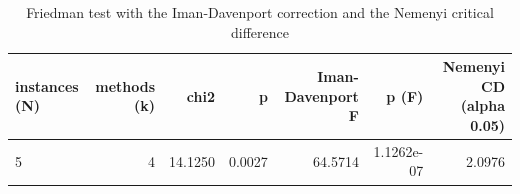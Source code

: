 \begin{table}[htbp]
\centering
\small
\caption{Friedman test with the Iman-Davenport correction and the Nemenyi critical difference}
\label{tab:E3x_long_runs_xlarge_b600_friedman_test}
\begin{tabular}{lrrrrrr}
\toprule
instances (N) & methods (k) & chi2 & p & Iman-Davenport F & p (F) & Nemenyi CD (alpha 0.05) \\
\midrule
5 & 4 & 14.1250 & 0.0027 & 64.5714 & 1.1262e-07 & 2.0976 \\
\bottomrule
\end{tabular}
\end{table}
